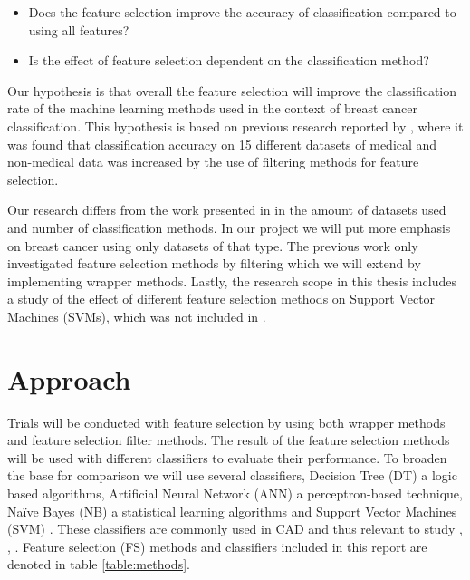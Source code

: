 \begin{itemize}
  \item Does the feature selection improve the accuracy of classification compared to using all features?
  \item Is the effect of feature selection dependent on the classification method?
\end{itemize}

Our hypothesis is that overall the feature selection will improve the classification rate of the machine learning methods used in the context of breast cancer classification. This hypothesis is based on previous research reported by \textcite{karabulut2012}, where it was found that classification accuracy on 15 different datasets of medical and non-medical data was increased by the use of filtering methods for feature selection.

Our research differs from the work presented in \parencite{karabulut2012} in the amount of datasets used and number of classification methods. In our project we will put more emphasis on breast cancer using only datasets of that type. The previous work only investigated feature selection methods by filtering which we will extend by implementing wrapper methods. Lastly, the research scope in this thesis includes a study of the effect of different feature selection methods on Support Vector Machines (SVMs), which was not included in \parencite{karabulut2012}.


\section{Approach}

Trials will be conducted with feature selection by using both wrapper methods and feature selection filter methods. The result of the feature selection methods will be used with different classifiers to evaluate their performance. To broaden the base for comparison we will use several classifiers, Decision Tree (DT) a logic based algorithms, Artificial Neural Network (ANN) a perceptron-based technique, Naïve Bayes (NB) a statistical learning algorithms and Support Vector Machines (SVM) \parencite{wallace2007}. These classifiers are commonly used in CAD and thus relevant to study \parencite{ramos2012}, \parencite{akay2009}, \parencite{li2007}. Feature selection (FS) methods and classifiers included in this report are denoted in table \ref{table:methods}.



